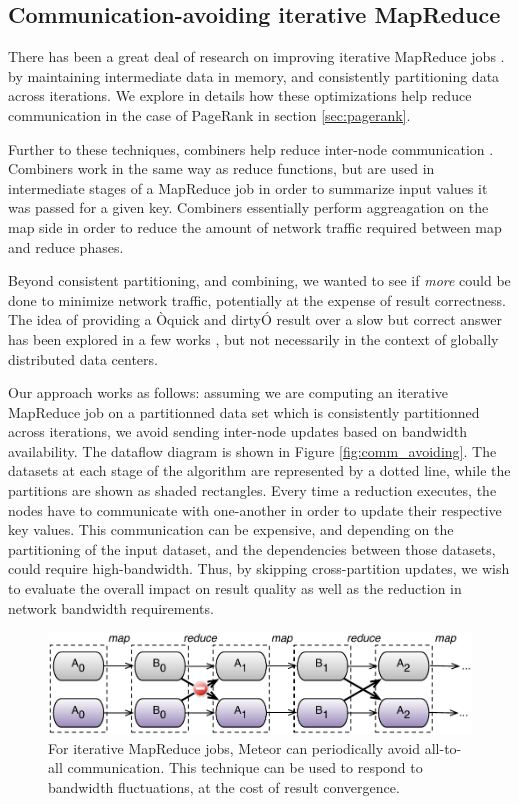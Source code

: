 \subsection{Communication-avoiding iterative MapReduce}

There has been a great deal of research on improving iterative MapReduce jobs \cite{haloop, twister, rdd}. by maintaining intermediate data in memory, and consistently partitioning data across iterations. We explore in details how these optimizations help reduce communication in the case of PageRank in section \ref{sec:pagerank}.

Further to these techniques, combiners help reduce inter-node communication \cite{hop}. Combiners work in the same way as reduce functions, but are used in intermediate stages of a MapReduce job in order to summarize input values it was passed for a given key. Combiners essentially perform aggreagation on the map side in order to reduce the amount of network traffic required between map and reduce phases.  

Beyond consistent partitioning, and combining, we wanted to see if \emph{more} could be done to minimize network traffic, potentially at the expense of result correctness. The idea of providing a Òquick and dirtyÓ result over a slow but correct answer has been explored in a few works \cite{blinkdb, hop}, but not necessarily in the context of globally distributed data centers.

Our approach works as follows: assuming we are computing an iterative MapReduce job on a partitionned data set which is consistently partitionned across iterations, we avoid sending inter-node updates based on bandwidth availability. The dataflow diagram is shown in Figure \ref{fig:comm_avoiding}. The datasets at each stage of the algorithm are represented by a dotted line, while the partitions are shown as shaded rectangles. Every time a reduction executes, the nodes have to communicate with one-another in order to update their respective key values. This communication can be expensive, and depending on the partitioning of the input dataset, and the dependencies between those datasets, could require high-bandwidth. Thus, by skipping cross-partition updates, we wish to evaluate the overall impact on result quality as well as the reduction in network bandwidth requirements.

\begin{figure}[!ht]
\centering\includegraphics[width=0.9\columnwidth]{figs/comm_avoiding.pdf}
\caption{For iterative MapReduce jobs, Meteor can periodically avoid all-to-all communication. This technique can be used to respond to bandwidth fluctuations, at the cost of result convergence.}
\label{fig:baws}
\vspace{.7em}
\end{figure}
